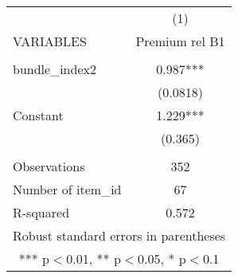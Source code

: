 \documentclass[]{article}
\begin{document}
\begin{tabular}{lc} \hline
 & (1) \\
VARIABLES & Premium rel B1 \\ \hline
 &  \\
bundle\_index2 & 0.987*** \\
 & (0.0818) \\
Constant & 1.229*** \\
 & (0.365) \\
 &  \\
Observations & 352 \\
Number of item\_id & 67 \\
 R-squared & 0.572 \\ \hline
\multicolumn{2}{c}{ Robust standard errors in parentheses} \\
\multicolumn{2}{c}{ *** p$<$0.01, ** p$<$0.05, * p$<$0.1} \\
\end{tabular}
\end{document}
